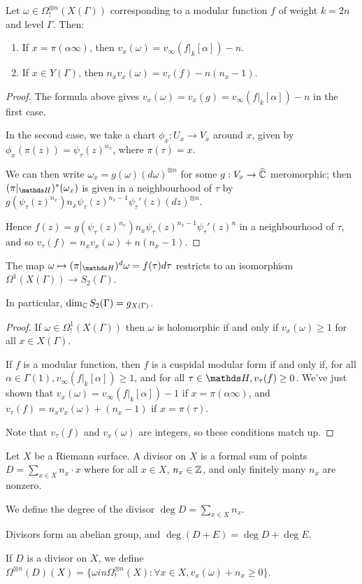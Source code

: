 \documentclass[10pt,a4paper]{article}
\begin{document}
\begin{proposition}
  Let $\omega \in \Omega_!^{\otimes n}(X(\Gamma))$ corresponding to a modular function $f$ of weight $k=2n$ and level $\Gamma$.  Then:
  \begin{enumerate}
    \item If $x = \pi(\alpha \infty)$, then $v_x(\omega) = v_\infty(f|_k[\alpha]) - n$.
    \item If $x \in Y(\Gamma)$, then $n_x v_x(\omega) = v_\tau(f)-n(n_x-1)$.
  \end{enumerate}
\end{proposition}
\begin{proof}
  The formula above gives $v_x(\omega) = v_x(g) = v_\infty(f|_k[\alpha]) - n$ in the first case.

  In the second case, we take a chart $\phi_x:U_x \to V_x$ around $x$, given by $\phi_x(\pi(z)) = \psi_\tau(z)^{n_x}$, where $\pi(\tau) = x$.

  We can then write $\omega_x = g(\omega)(d\omega)^{\otimes n}$ for some $g:V_x \to \widehat{\mathbb{C}}$ meromorphic; then $(\pi|_{\H})^\ast(\omega_x)$ is given in a neighbourhood of $\tau$ by $g(\psi_\tau(z)^{n_x})n_x \psi_\tau(z)^{n_x-1}\psi_\tau'(z)(dz)^{\otimes n}$.

  Hence $f(z) = g(\psi_\tau(z)^{n_x})n_x\psi_\tau(z)^{n_x-1}\psi_\tau'(z)^n$ in a neighbourhood of $\tau$, and so $v_\tau(f) = n_x v_x(\omega) + n(n_x-1)$.
\end{proof}
\begin{corollary}
  The map $\omega \mapsto (\pi|_{\H})^d \omega = f(\tau)d\tau$ restricts to an isomorphism $\Omega^1(X(\Gamma)) \to S_2(\Gamma)$.

  In particular, $\dim_{\mathbb{C}} S_2(\Gamma) = g_{X(\Gamma)}$.
\end{corollary}
\begin{proof}
  If $\omega \in \Omega^1_!(X(\Gamma))$ then $\omega$ is holomorphic if and only if $v_x(\omega) \geq 1$ for all $x \in X(\Gamma)$.

  If $f$ is a modular function, then $f$ is a cuspidal modular form if and only if, for all $\alpha \in \Gamma(1), v_\infty(f|_k[\alpha]) \geq 1$, and for all $\tau \in \H, v_\tau(f) \geq 0$. We've just shown that $v_x(\omega) = v_\infty(f|_k[\alpha]) - 1$ if $x = \pi(\alpha\infty)$, and $v_\tau(f) = n_xv_x(\omega) + (n_x-1)$ if $x = \pi(\tau)$.

  Note that $v_\tau(f)$ and $v_x(\omega)$ are integers, so these conditions match up.
\end{proof}
\begin{definition}
  Let $X$ be a Riemann surface. A divisor on $X$ is a formal sum of points $D=\sum_{x \in X} n_x \cdot x$ where for all $x \in X$, $n_x \in \mathbb{Z}$, and only finitely many $n_x$ are nonzero.

  We define the degree of the divisor $\deg D = \sum_{x\in X} n_x$.

  Divisors form an abelian group, and $\deg(D+E) = \deg D + \deg E$.

  If $D$ is a divisor on $X$, we define $\Omega^{\otimes n}(D)(X) = \{\omega in \Omega^{\otimes n}_! (X) : \forall x \in X, v_x(\omega) + n_x \geq 0\}$.
\end{definition}
\end{document}
